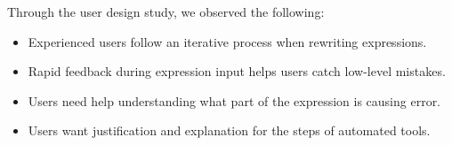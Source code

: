 Through the user design study, we observed the following:
\begin{itemize}[label=$\circ$]
  \item Experienced users follow an iterative process when rewriting expressions.
  \item Rapid feedback during expression input
    helps users catch low-level mistakes.
  \item Users need help understanding what part of the expression is causing error.
  \item Users want justification and explanation for the steps of automated tools.
\end{itemize}
